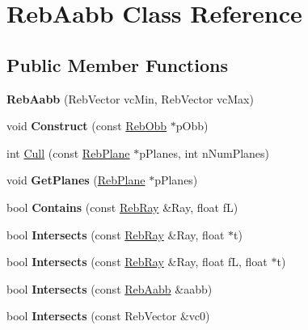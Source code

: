 \hypertarget{class_reb_aabb}{}\section{Reb\+Aabb Class Reference}
\label{class_reb_aabb}
\subsection*{Public Member Functions}
\begin{DoxyCompactItemize}
\item 
{\bfseries Reb\+Aabb} (Reb\+Vector vc\+Min, Reb\+Vector vc\+Max)\hypertarget{class_reb_aabb_adad0530f6ea18856446ada9a500046c8}{}\label{class_reb_aabb_adad0530f6ea18856446ada9a500046c8}

\item 
void {\bfseries Construct} (const \hyperlink{class_reb_obb}{Reb\+Obb} $\ast$p\+Obb)\hypertarget{class_reb_aabb_a842c0c11da33dcc252aaf7bfc08e5383}{}\label{class_reb_aabb_a842c0c11da33dcc252aaf7bfc08e5383}

\item 
int \hyperlink{class_reb_aabb_aa014c181038ba708fd3417302314cfef}{Cull} (const \hyperlink{class_reb_plane}{Reb\+Plane} $\ast$p\+Planes, int n\+Num\+Planes)
\item 
void {\bfseries Get\+Planes} (\hyperlink{class_reb_plane}{Reb\+Plane} $\ast$p\+Planes)\hypertarget{class_reb_aabb_a9c84f6459e1166c5756bf9dc206f40a5}{}\label{class_reb_aabb_a9c84f6459e1166c5756bf9dc206f40a5}

\item 
bool {\bfseries Contains} (const \hyperlink{class_reb_ray}{Reb\+Ray} \&Ray, float fL)\hypertarget{class_reb_aabb_a61bca793740fd05e25e3cb195a7518fb}{}\label{class_reb_aabb_a61bca793740fd05e25e3cb195a7518fb}

\item 
bool {\bfseries Intersects} (const \hyperlink{class_reb_ray}{Reb\+Ray} \&Ray, float $\ast$t)\hypertarget{class_reb_aabb_a1d6c74f5c62fef77121c9a829b389531}{}\label{class_reb_aabb_a1d6c74f5c62fef77121c9a829b389531}

\item 
bool {\bfseries Intersects} (const \hyperlink{class_reb_ray}{Reb\+Ray} \&Ray, float fL, float $\ast$t)\hypertarget{class_reb_aabb_ab09b2c44469e8107b5bfafab70bff413}{}\label{class_reb_aabb_ab09b2c44469e8107b5bfafab70bff413}

\item 
bool {\bfseries Intersects} (const \hyperlink{class_reb_aabb}{Reb\+Aabb} \&aabb)\hypertarget{class_reb_aabb_a9647aeefd17dadf7925468db4c84fb5a}{}\label{class_reb_aabb_a9647aeefd17dadf7925468db4c84fb5a}

\item 
bool {\bfseries Intersects} (const Reb\+Vector \&vc0)\hypertarget{class_reb_aabb_aa997b8a2529fd2478d62dcf63d3cb26f}{}\label{class_reb_aabb_aa997b8a2529fd2478d62dcf63d3cb26f}

\end{DoxyCompactItemize}
